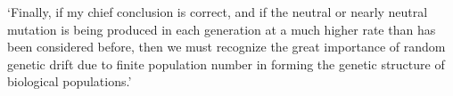 \begin{savequote}[8cm]


	‘Finally, if my chief conclusion is correct, and if the neutral or nearly neutral mutation is being produced in each generation at a much higher rate than has been considered before, then we must recognize the great importance of random genetic drift due to finite population number in forming the genetic structure of biological populations.’
	


\end{savequote}
